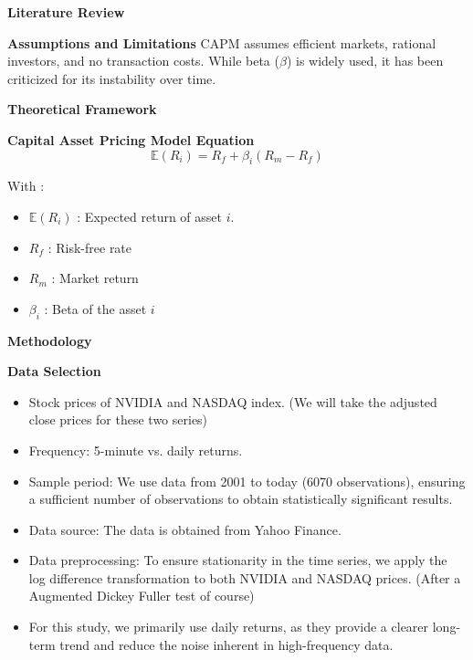 \documentclass{beamer}
\begin{document}
\begin{frame}{\textbf{Literature Review}}
\begin{block}{\textbf{Assumptions and Limitations}}
CAPM assumes efficient markets, rational investors, and no transaction costs. While beta (\(\beta\)) is widely used, it has been criticized for its instability over time.
\end{block}
\end{frame}

\begin{frame}{\textbf{Theoretical Framework}}


\begin{alertblock}{\textbf{Capital Asset Pricing Model Equation}}
	\[ \mathbb{E}(R_i)=R_f+\beta_i(R_m-R_f) \]
\end{alertblock}
With :

\begin{itemize}
	\item \( \mathbb{E}(R_i) \) : Expected return of asset \( i \).
	\item \( R_f \) : Risk-free rate
	\item \( R_m \) : Market return
	\item  \( \beta_i \) : Beta of the asset \( i \)
\end{itemize}


\end{frame}

\begin{frame}{\textbf{Methodology}}
\begin{exampleblock}{\textbf{Data Selection}}
	
\begin{itemize}
\item Stock prices of NVIDIA and NASDAQ index. (We will take the adjusted close prices for these two series)
	\item 	Frequency: 5-minute vs. daily returns.
	\item 	Sample period: We use data from 2001 to today (6070 observations), ensuring a sufficient number of observations to obtain statistically significant results.
	\item 	Data source: The data is obtained from Yahoo Finance.
	\item 	Data preprocessing: To ensure stationarity in the time series, we apply the log difference transformation to both NVIDIA and NASDAQ prices. (After a Augmented Dickey Fuller test of course)
	
	\item 	For this study, we primarily use daily returns, as they provide a clearer long-term trend and reduce the noise inherent in high-frequency data.
\end{itemize}
\end{exampleblock}
\end{frame}
\end{document}

